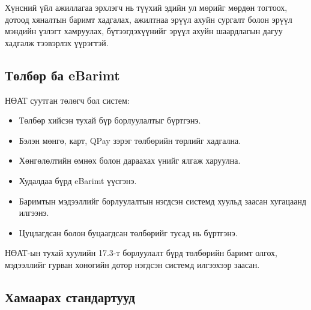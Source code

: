 Хүнсний үйл ажиллагаа эрхлэгч нь түүхий эдийн ул мөрийг мөрдөн тогтоох, дотоод хяналтын баримт хадгалах, ажилтнаа эрүүл ахуйн сургалт болон эрүүл мэндийн үзлэгт хамруулах, бүтээгдэхүүнийг эрүүл ахуйн шаардлагын дагуу хадгалж тээвэрлэх үүрэгтэй.

\subsection{Төлбөр ба eBarimt}

НӨАТ суутган төлөгч бол систем:
\begin{itemize}
    \item Төлбөр хийсэн тухай бүр борлуулалтыг бүртгэнэ.
    \item Бэлэн мөнгө, карт, QPay зэрэг төлбөрийн төрлийг хадгална.
    \item Хөнгөлөлтийн өмнөх болон дараахах үнийг ялгаж харуулна.
    \item Худалдаа бүрд eBarimt үүсгэнэ.
    \item Баримтын мэдээллийг борлуулалтын нэгдсэн системд хуульд заасан хугацаанд илгээнэ.
    \item Цуцлагдсан болон буцаагдсан төлбөрийг тусад нь бүртгэнэ.
\end{itemize}

НӨАТ-ын тухай хуулийн 17.3-т борлуулалт бүрд төлбөрийн баримт олгох, мэдээллийг гурван хоногийн дотор нэгдсэн системд илгээхээр заасан.


\subsection{Хамаарах стандартууд}

